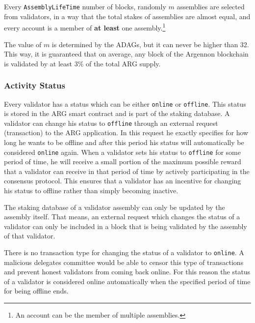 Every \texttt{AssemblyLifeTime} number of blocks, randomly $m$ assemblies are selected from
validators, in a way that the total stakes of assemblies are almost equal, and every
account is a member of \textbf{at least} one assembly.\footnote{An account can be the member of multiple assemblies.}

The value of $m$ is determined by the ADAGs, but it can never be higher than $32$. This way, it is guaranteed
that on average, any block of the Argennon blockchain is validated by at least $3\%$ of the total ARG supply.

\subsubsection{Activity Status}

Every validator has a status which can be either \texttt{online} or \texttt{offline}.
This status is stored in the ARG smart contract and is part of the staking database. A validator can change
his status to \texttt{offline} through an external request (transaction) to the ARG application. In this request he
exactly specifies for how long he wants to be offline and after this period his status will automatically be considered
\texttt{online} again. When a validator sets his status to \texttt{offline} for some period of time, he
will receive a small portion of the maximum possible reward that a validator can receive in that period of time by
actively participating in the consensus protocol. This ensures that a validator has an incentive for changing his
status to offline rather than simply becoming inactive.

The staking database of a validator assembly can only be updated by the assembly itself. That means, an external
request which changes the status of a validator can only be included in a block that is being validated by the
assembly of that validator.

There is no transaction type for changing the status of a validator to \texttt{online}. A malicious delegates committee
would be able to censor this type of transactions and prevent honest validators from coming back online. For this reason
the status of a validator is considered online automatically when the specified period of time for being offline ends.

